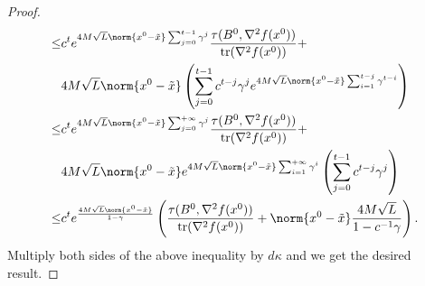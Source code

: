 \begin{proof}
\begin{align*}
         \leq & c^t e^ {4 M \sqrt{L}  \norm{x^0 - \Tilde{x}} \sum_{j =0}^{t-1}\gamma^{j}} \frac{\tau (B^{0}, \nabla^2 f(x^{0}))}{\mathrm{tr}(\nabla^2 f(x^{0}))} + \\
         & 4 M \sqrt{L}  \norm{x^0 - \Tilde{x}}\left(\sum_{j=0}^{t-1} c^{t-j}\gamma^{j} e^ {4 M \sqrt{L}  \norm{x^0 - \Tilde{x}} \sum_{i=1}^{t-j} \gamma^{t-i}}\right)  \\
         \leq & c^t e^ {4 M \sqrt{L}  \norm{x^0 - \Tilde{x}} \sum_{j =0}^{+ \infty}\gamma^{j}} \frac{\tau (B^{0}, \nabla^2 f(x^{0}))}{\mathrm{tr}(\nabla^2 f(x^{0}))} + \\
         & 4 M \sqrt{L}  \norm{x^0 - \Tilde{x}} e^ {4 M \sqrt{L}  \norm{x^0 - \Tilde{x}} \sum_{i=1}^{+\infty} \gamma^{i}} \left(\sum_{j=0}^{t-1} c^{t-j}\gamma^{j} \right)  \\
         \leq & c^t e^ {\frac{4 M \sqrt{L}  \norm{x^0 - \Tilde{x}}}{1 - \gamma} } \left( \frac{\tau (B^{0}, \nabla^2 f(x^{0}))}{\mathrm{tr}(\nabla^2 f(x^{0}))} + \norm{x^0 - \Tilde{x}} \frac{4 M \sqrt{L}}{1 - c^{-1} \gamma}  \right) . 
    \end{align*}
    Multiply both sides of the above inequality by $d \kappa$ and we get the desired result. 
\end{proof}

